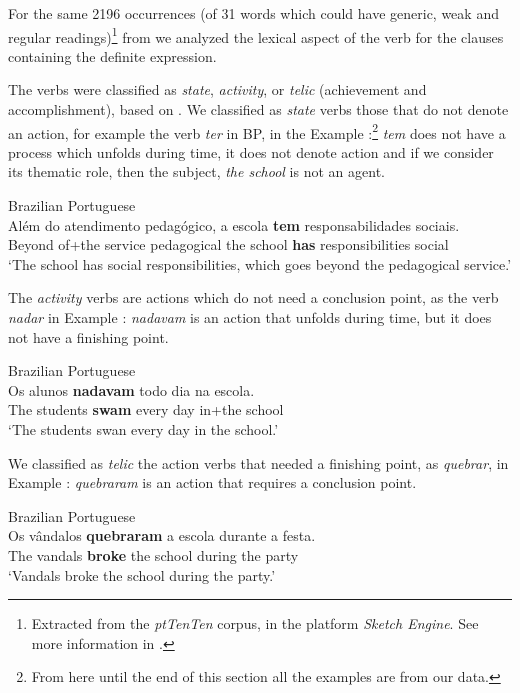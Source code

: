 \documentclass[output=paper,
modfonts
]{langscibook}
\begin{document}
For the same 2196 occurrences (of 31 words which could have generic, weak and regular readings)\footnote{Extracted from the \textit{ptTenTen} corpus, in the platform \textit{Sketch Engine}. See more information in \citet{deSaEtAlii2016}.} from \citet{deSaEtAlii2016} we analyzed the lexical aspect of the verb for the clauses containing the definite expression.

The verbs were classified as \textit{state}, \textit{activity}, or \textit{telic} (achievement and accomplishment), based on \citet{Vendler1957}. We classified as \textit{state} verbs those that do not denote an action, for example the verb \textit{ter} in BP, in the Example :\footnote{From here until the end of this section all the examples are from our data.} \textit{tem} does not have a process which unfolds during time, it does not denote action and if we consider its thematic role, then the subject, \textit{the school} is not an agent. 

\ea \label{ex:desaetal:4}
Brazilian Portuguese\\
\gll Além do atendimento pedagógico, a escola \textbf{tem} responsabilidades sociais. \\
Beyond of+the service pedagogical the school \textbf{has} responsibilities social\\  
\glt ‘The school has social responsibilities, which goes beyond the pedagogical service.’
\z

The \textit{activity} verbs are actions which do not need a conclusion point, as the verb \textit{nadar} in Example : \textit{nadavam} is an action that unfolds during time, but it does not have a finishing point.

\ea \label{ex:desaetal:5}
Brazilian Portuguese\\
\gll Os alunos \textbf{nadavam} todo dia na escola.\\
The students \textbf{swam} every day in+the school\\
\glt  `The students swan every day in the school.'
\z

We classified as \textit{telic} the action verbs that needed a finishing point, as \textit{quebrar}, in Example : \textit{quebraram} is an action that requires a conclusion point.

\ea \label{ex:desaetal:6}
Brazilian Portuguese\\
\gll Os vândalos \textbf{quebraram} a escola durante a festa.\\
The vandals \textbf{broke} the school during the party\\
\glt `Vandals broke the school during the party.'
\z
\end{document}
